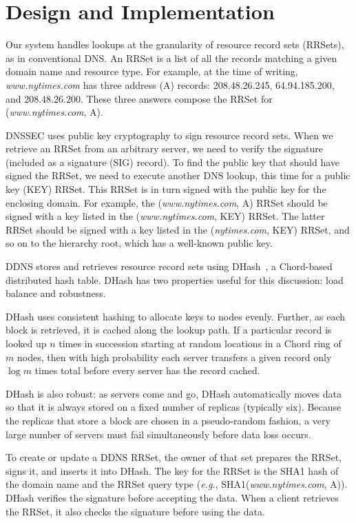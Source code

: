 \section{Design and Implementation}

Our system handles lookups at the granularity of resource record sets (RRSets),
as in conventional DNS.
An RRSet is a list of all the records matching a
given domain name and resource type.
For example, at the time of writing, {\em www.nytimes.com}
has three address (A) records: 208.48.26.245, 64.94.185.200,
and 208.48.26.200.  These three answers compose the RRSet
for ({\em www.nytimes.com}, A).

DNSSEC uses public key cryptography to sign resource record
sets.  When we retrieve an RRSet from an arbitrary
server, we need to verify the signature (included as a 
signature (SIG) record).
To find the public key that should have signed the RRSet,
we need to execute another DNS lookup, 
this time for a public key (KEY) RRSet.
This RRSet is in turn signed with the public key for the
enclosing domain.
For example, the ({\em www.nytimes.com}, A) RRSet should
be signed with a key listed in the ({\em www.nytimes.com}, KEY) RRSet.
The latter RRSet should be signed with a key
listed in the ({\em nytimes.com}, KEY)
RRSet, and so on to the hierarchy root,
which has a well-known public key.

DDNS stores and retrieves resource record sets using
DHash~\cite{cfs:sosp01}, a Chord-based distributed hash table.
DHash has two properties useful for this
discussion: load balance and robustness.

DHash uses consistent hashing to allocate keys to nodes evenly.
Further, as each block is retrieved, it is cached along
the lookup path.
If a particular record is looked up $n$ times in succession
starting at random locations in a Chord ring of $m$ nodes, 
then with high probability
each server transfers a given record only $\log{m}$ times total
before every server has the record cached.

DHash is also robust: as servers come and go, DHash automatically
moves data so that it is always stored on a fixed number of replicas
(typically six).  Because the replicas that store a block are chosen
in a pseudo-random fashion, a very large number of servers must
fail simultaneously before data loss occurs. 

To create or update a DDNS RRSet, the owner of that set prepares
the RRSet, signs it, and inserts it into DHash.
The key for the RRSet is the SHA1 hash of the domain name and the RRSet query type
({\em e.g.}, SHA1({\em www.nytimes.com}, A)).
DHash verifies the signature before accepting the data.
When a client retrieves the RRSet, it also checks 
the signature before using the data.

